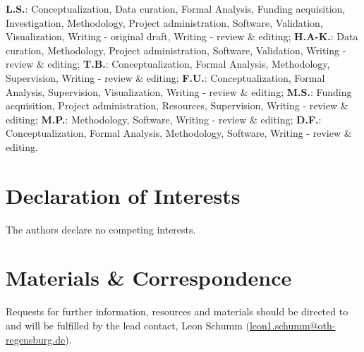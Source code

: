\documentclass[5p,numafflabel]{elsarticle}
\begin{document}
\textbf{L.S.}:
Conceptualization,
Data curation,
Formal Analysis,
Funding acquisition,
Investigation,
Methodology,
Project administration,
Software,
Validation,
Visualization,
Writing - original draft,
Writing - review \& editing;
\textbf{H.A-K.}:
Data curation,
Methodology,
Project administration,
Software,
Validation,
Writing - review \& editing;
\textbf{T.B.}:
Conceptualization,
Formal Analysis,
Methodology,
Supervision,
Writing - review \& editing;
\textbf{F.U.}:
Conceptualization,
Formal Analysis,
Supervision,
Visualization,
Writing - review \& editing;
\textbf{M.S.}:
Funding acquisition,
Project administration,
Resources,
Supervision,
Writing - review \& editing;
\textbf{M.P.}:
Methodology,
Software,
Writing - review \& editing;
\textbf{D.F.}:
Conceptualization,
Formal Analysis,
Methodology,
Software,
Writing - review \& editing.


\section*{Declaration of Interests}

The authors declare no competing interests.


\section*{Materials \& Correspondence}

Requests for further information, resources and materials should be directed to and will be fulfilled by the lead contact, Leon Schumm
(\href{mailto:leon1.schumm@oth-regensburg.de}{leon1.schumm@oth-regensburg.de}).
\end{document}
